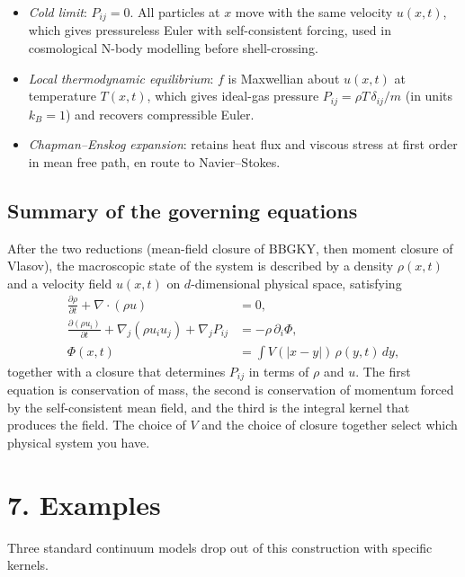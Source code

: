 \documentclass{article}
\begin{document}
\begin{itemize}
\item \emph{Cold limit}: \(P_{ij} = 0\). All particles at \(x\) move with the same velocity \(u(x,t)\), which gives pressureless Euler with self-consistent forcing, used in cosmological N-body modelling before shell-crossing.
\item \emph{Local thermodynamic equilibrium}: \(f\) is Maxwellian about \(u(x,t)\) at temperature \(T(x,t)\), which gives ideal-gas pressure \(P_{ij} = \rho T\, \delta_{ij}/m\) (in units \(k_B = 1\)) and recovers compressible Euler.
\item \emph{Chapman--Enskog expansion}: retains heat flux and viscous stress at first order in mean free path, en route to Navier--Stokes.
\end{itemize}

\subsection*{Summary of the governing equations}

After the two reductions (mean-field closure of BBGKY, then moment closure of Vlasov), the macroscopic state of the system is described by a density \(\rho(x,t)\) and a velocity field \(u(x,t)\) on \(d\)-dimensional physical space, satisfying
\begin{subequations}
\label{eq:fluid}
\begin{align}
\frac{\partial \rho}{\partial t} + \nabla \cdot (\rho u) &= 0, \\
\frac{\partial (\rho u_i)}{\partial t} + \nabla_j(\rho u_i u_j) + \nabla_j P_{ij} &= -\rho\, \partial_i \Phi, \\
\Phi(x,t) &= \int V(|x-y|)\, \rho(y,t)\, dy,
\end{align}
\end{subequations}
together with a closure that determines \(P_{ij}\) in terms of \(\rho\) and \(u\). The first equation is conservation of mass, the second is conservation of momentum forced by the self-consistent mean field, and the third is the integral kernel that produces the field. The choice of \(V\) and the choice of closure together select which physical system you have.

\section*{7. Examples}

Three standard continuum models drop out of this construction with specific kernels.
\end{document}
